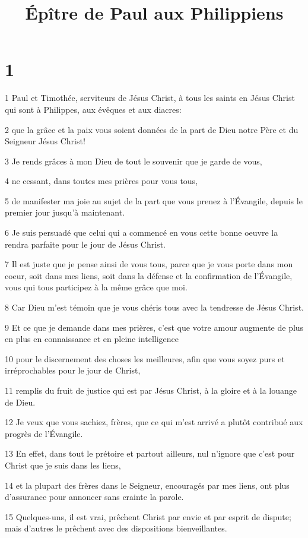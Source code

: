 

\title{Épître de Paul aux Philippiens}


\chapter{1}

\par 1 Paul et Timothée, serviteurs de Jésus Christ, à tous les saints en Jésus Christ qui sont à Philippes, aux évêques et aux diacres:
\par 2 que la grâce et la paix vous soient données de la part de Dieu notre Père et du Seigneur Jésus Christ!
\par 3 Je rends grâces à mon Dieu de tout le souvenir que je garde de vous,
\par 4 ne cessant, dans toutes mes prières pour vous tous,
\par 5 de manifester ma joie au sujet de la part que vous prenez à l'Évangile, depuis le premier jour jusqu'à maintenant.
\par 6 Je suis persuadé que celui qui a commencé en vous cette bonne oeuvre la rendra parfaite pour le jour de Jésus Christ.
\par 7 Il est juste que je pense ainsi de vous tous, parce que je vous porte dans mon coeur, soit dans mes liens, soit dans la défense et la confirmation de l'Évangile, vous qui tous participez à la même grâce que moi.
\par 8 Car Dieu m'est témoin que je vous chéris tous avec la tendresse de Jésus Christ.
\par 9 Et ce que je demande dans mes prières, c'est que votre amour augmente de plus en plus en connaissance et en pleine intelligence
\par 10 pour le discernement des choses les meilleures, afin que vous soyez purs et irréprochables pour le jour de Christ,
\par 11 remplis du fruit de justice qui est par Jésus Christ, à la gloire et à la louange de Dieu.
\par 12 Je veux que vous sachiez, frères, que ce qui m'est arrivé a plutôt contribué aux progrès de l'Évangile.
\par 13 En effet, dans tout le prétoire et partout ailleurs, nul n'ignore que c'est pour Christ que je suis dans les liens,
\par 14 et la plupart des frères dans le Seigneur, encouragés par mes liens, ont plus d'assurance pour annoncer sans crainte la parole.
\par 15 Quelques-uns, il est vrai, prêchent Christ par envie et par esprit de dispute; mais d'autres le prêchent avec des dispositions bienveillantes.
